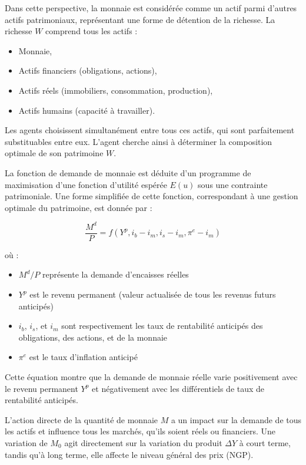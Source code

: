 \documentclass[a4paper, 12pt]{report}
\begin{document}
Dans cette perspective, la monnaie est considérée comme un actif parmi d'autres actifs patrimoniaux, représentant une forme de détention de la richesse. La richesse \( W \) comprend tous les actifs : 

\begin{itemize}
	\item Monnaie,
	\item Actifs financiers (obligations, actions),
	\item Actifs réels (immobiliers, consommation, production),
	\item Actifs humains (capacité à travailler).
\end{itemize}

Les agents choisissent simultanément entre tous ces actifs, qui sont parfaitement substituables entre eux. L'agent cherche ainsi à déterminer la composition optimale de son patrimoine \( W \).

La fonction de demande de monnaie est déduite d'un programme de maximisation d'une fonction d'utilité espérée $E(u)$ sous une contrainte patrimoniale. Une forme simplifiée de cette fonction, correspondant à une gestion optimale du patrimoine, est donnée par :

$$\frac{M^d}{P} = f(Y^p, i_b - i_m, i_s - i_m, \pi^e - i_m)$$

où :
\begin{itemize}
	\item $M^d/P$ représente la demande d'encaisses réelles
	\item $Y^p$ est le revenu permanent (valeur actualisée de tous les revenus futurs anticipés)
	\item $i_b$, $i_s$, et $i_m$ sont respectivement les taux de rentabilité anticipés des obligations, des actions, et de la monnaie
	\item $\pi^e$ est le taux d'inflation anticipé
\end{itemize}

Cette équation montre que la demande de monnaie réelle varie positivement avec le revenu permanent $Y^p$ et négativement avec les différentiels de taux de rentabilité anticipés.

L'action directe de la quantité de monnaie \( M \) a un impact sur la demande de tous les actifs et influence tous les marchés, qu'ils soient réels ou financiers. Une variation de \( M_0 \) agit directement sur la variation du produit \( \Delta Y \) à court terme, tandis qu'à long terme, elle affecte le niveau général des prix (NGP).
\end{document}
